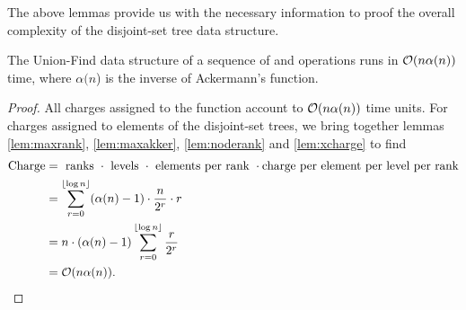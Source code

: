 The above lemmas provide us with the necessary information to proof the overall complexity of the disjoint-set tree data structure. 
\begin{theorem}\label{the:ufcomplexity}
  The Union-Find data structure of a sequence of  and  operations runs in $\mathcal{O}(n\alpha(n))$ time, where $\alpha(n$) is the inverse of Ackermann's function.
\end{theorem}
\begin{proof}
  All charges assigned to the  function account to $\mathcal{O}(n\alpha(n))$ time units. For charges assigned to elements of the disjoint-set trees, we bring together lemmas \ref{lem:maxrank}, \ref{lem:maxakker}, \ref{lem:noderank} and \ref{lem:xcharge} to find 
  \begin{align*}
    \text{Charge} &= \text{ ranks } \cdot \text{ levels } \cdot \text{ elements per rank } \cdot \text{charge per element per level per rank}\\
    &= \sum_{r=0}^{\lfloor \log n \rfloor} (\alpha(n)-1)\cdot \frac{n}{2^r}\cdot r\\
    &= n\cdot (\alpha(n)-1)\sum_{r=0}^{\lfloor \log n \rfloor}\frac{r}{2^r} \\
    &= \mathcal{O}(n\alpha(n)).
  \end{align*}
\end{proof}
